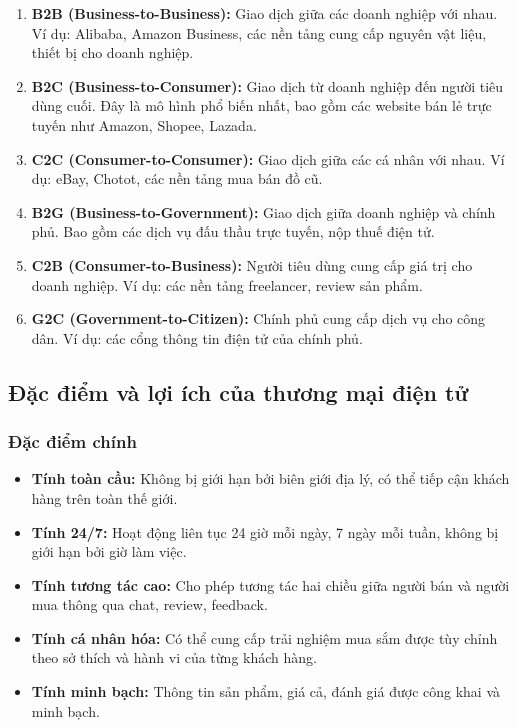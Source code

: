 \documentclass[a4paper,12pt]{report}
\begin{document}
\begin{enumerate}
    \item \textbf{B2B (Business-to-Business):} Giao dịch giữa các doanh nghiệp với nhau. Ví dụ: Alibaba, Amazon Business, các nền tảng cung cấp nguyên vật liệu, thiết bị cho doanh nghiệp.
    
    \item \textbf{B2C (Business-to-Consumer):} Giao dịch từ doanh nghiệp đến người tiêu dùng cuối. Đây là mô hình phổ biến nhất, bao gồm các website bán lẻ trực tuyến như Amazon, Shopee, Lazada.
    
    \item \textbf{C2C (Consumer-to-Consumer):} Giao dịch giữa các cá nhân với nhau. Ví dụ: eBay, Chotot, các nền tảng mua bán đồ cũ.
    
    \item \textbf{B2G (Business-to-Government):} Giao dịch giữa doanh nghiệp và chính phủ. Bao gồm các dịch vụ đấu thầu trực tuyến, nộp thuế điện tử.
    
    \item \textbf{C2B (Consumer-to-Business):} Người tiêu dùng cung cấp giá trị cho doanh nghiệp. Ví dụ: các nền tảng freelancer, review sản phẩm.
    
    \item \textbf{G2C (Government-to-Citizen):} Chính phủ cung cấp dịch vụ cho công dân. Ví dụ: các cổng thông tin điện tử của chính phủ.
\end{enumerate}

\subsection{Đặc điểm và lợi ích của thương mại điện tử}

\subsubsection{Đặc điểm chính}
\begin{itemize}
    \item \textbf{Tính toàn cầu:} Không bị giới hạn bởi biên giới địa lý, có thể tiếp cận khách hàng trên toàn thế giới.
    
    \item \textbf{Tính 24/7:} Hoạt động liên tục 24 giờ mỗi ngày, 7 ngày mỗi tuần, không bị giới hạn bởi giờ làm việc.
    
    \item \textbf{Tính tương tác cao:} Cho phép tương tác hai chiều giữa người bán và người mua thông qua chat, review, feedback.
    
    \item \textbf{Tính cá nhân hóa:} Có thể cung cấp trải nghiệm mua sắm được tùy chỉnh theo sở thích và hành vi của từng khách hàng.
    
    \item \textbf{Tính minh bạch:} Thông tin sản phẩm, giá cả, đánh giá được công khai và minh bạch.
\end{itemize}
\end{document}
